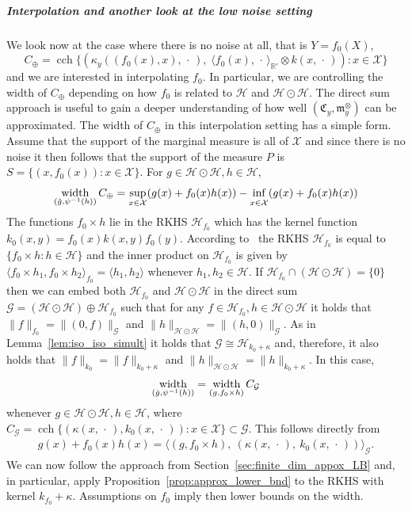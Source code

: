 \documentclass[10pt]{amsart}
\theoremstyle{definition}\newtheorem{defi}[theo]{Definition}\newtheorem{rema}[theo]{Remark}\newtheorem{exam}[theo]{Example}\newtheorem{exem}[theo]{Example}\newtheorem{nota}[theo]{Notation}
\theoremstyle{remark}
\DeclareMathOperator*{\infd}{inf\vphantom{p}}
\DeclareMathOperator{\cch}{cch}
\DeclareMathOperator{\diam}{width}
\newcommand{\R}{\mathbb{R}}
\newcommand{\dR}{{\R'}}
\newcommand{\X}{\mathcal{X}}
\newcommand{\cH}{\mathcal{H}}
\newcommand{\clG}{\mathcal{G}}
\newcommand{\fkC}{\mathfrak{C}}
\newcommand{\mean}{\mathfrak{m}}
\let\oldhat\hat
\renewcommand*{\hat}[1]{\mathchoice{\widehat{#1}}{\widehat{#1}}{\oldhat{#1}}{\oldhat{#1}}}
\let\originalleft\left
\let\originalright\right
\renewcommand{\left}{\mathopen{}\mathclose\bgroup\originalleft}
\renewcommand{\right}{\aftergroup\egroup\originalright}
\begin{document}
\subparagraph{Interpolation and another look at the low noise setting} \label{sec:simul_interpol}
We look now at the case where there is no noise at all, that is $Y = f_0(X)$,
\[
C_\oplus = \cch\bigl\{(\kappa_y((f_0(x),x),\,\cdot\,),\; \langle f_0(x),\,\cdot\, \rangle_{\dR} \otimes k(x,\,\cdot\,)) : x\in \X \bigr\}
\]
and we are interested in interpolating $f_0$. In particular, we are controlling the width of $C_\oplus$ depending on how $f_0$ is related to $\cH$ and $\cH \odot \cH$. The direct sum approach is useful to gain a deeper understanding of how well $(\fkC_y, \mean_y^\otimes)$ can be approximated. The width of $C_\oplus$ in this interpolation setting has a simple form. Assume that the support of the marginal measure is all of $\X$ and since there is no noise it then follows that the support of the measure $P$ is $S = \{ (x, f_0(x)) : x \in \X\}$. For $g \in \cH \odot \cH, h \in \cH$,
\[
\diam_{\left(\hat g,\psi^{-1}(h)\right)} C_\oplus = \sup_{x\in\X} (g(x) + f_0(x) h(x)) - \infd_{x\in \X} (g(x) + f_0(x)h(x))
\]
The functions $f_0 \times h$ lie in the RKHS $\cH_{f_0}$ which has the kernel function $k_0(x,y) = f_0(x) k(x,y) f_0(y)$. According to~\cite[Proposition~5.20]{PAUL16} the RKHS $\cH_{f_0}$ is equal to $\{f_0 \times h : h \in \cH\}$ and the inner product on $\cH_{f_0}$ is given by $ \langle f_0 \times h_1, f_0 \times h_2\rangle_{f_0} = \langle h_1,h_2 \rangle$ whenever $h_1,h_2 \in \cH$. If $\cH_{f_0} \cap (\cH \odot \cH) = \{0\}$ then we can embed both $\cH_{f_0}$ and $\cH \odot \cH$ in the direct sum $\clG = (\cH \odot \cH) \oplus \cH_{f_0}$ such that for any $f \in \cH_{f_0}, h \in \cH \odot \cH$ it holds that $\|f\|_{f_0} = \|(0,f)\|_{\clG}$ and $\|h \|_{\cH \odot \cH} = \|(h,0)\|_{\clG}$. As in Lemma~\ref{lem:iso_iso_simult} it holds that $\clG \cong \cH_{k_0 + \kappa}$ and, therefore, it also holds that $\|f\|_{k_0} = \|f\|_{k_0 + \kappa}$ and $\|h\|_{\cH \odot \cH} = \|h\|_{k_0 + \kappa}$. In this case,
\[
\diam_{\left(\hat g,\psi^{-1}(h)\right)} = \diam_{(g, f_0 \times h)} C_\clG
\]
whenever $g\in \cH\odot \cH, h \in \cH$, where $C_\clG = \cch \{ (\kappa(x,\,\cdot\,), k_0(x,\,\cdot\,)) : x \in \X \} \subset \clG$. This follows directly from
\begin{align*}
g(x) + f_0(x) h(x) = \bigl\langle (g,f_0 \times h),\: (\kappa(x,\,\cdot\,),\: k_0(x,\,\cdot\,)) \bigr\rangle_\clG.
\end{align*}
We can now follow the approach from Section~\ref{sec:finite_dim_appox_LB} and, in particular, apply Proposition~\ref{prop:approx_lower_bnd} to the RKHS with kernel $k_{f_0} + \kappa$. Assumptions on $f_0$ imply then lower bounds on the width.
\end{document}
